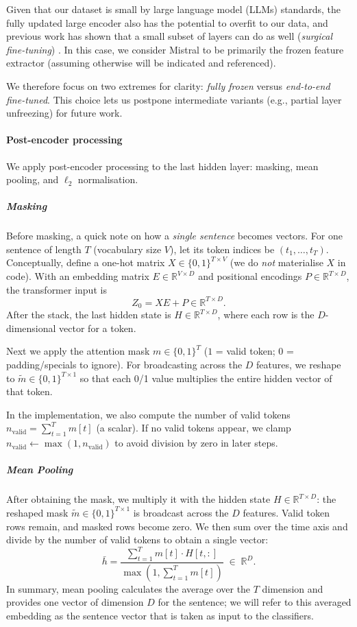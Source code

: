 \documentclass[12pt]{article}
\begin{document}
Given that our dataset is small by large language model (LLMs) standards, the fully updated large encoder also has the potential to overfit to our data, and previous work has shown that a small subset of layers can do as well (\emph{surgical fine-tuning}) \cite{lodha2023surgical}. In this case, we consider Mistral to be primarily the frozen feature extractor (assuming otherwise will be indicated and referenced).

We therefore focus on two extremes for clarity: \emph{fully frozen} versus \emph{end-to-end fine-tuned}. This choice lets us postpone intermediate variants (e.g., partial layer unfreezing) for future work.

\paragraph{Post-encoder processing}

We apply post-encoder processing to the last hidden layer: masking, mean pooling, and \(\ell_{2}\) normalisation.

%
\subparagraph{Masking}
Before masking, a quick note on how a \emph{single sentence} becomes vectors. For one sentence of length $T$ (vocabulary size $V$), let its token indices be $(t_1,\ldots,t_T)$. Conceptually, define a one-hot matrix $X \in \{0,1\}^{T \times V}$ (we do \emph{not} materialise $X$ in code). With an embedding matrix $E \in \mathbb{R}^{V \times D}$ and positional encodings $P \in \mathbb{R}^{T \times D}$, the transformer input is
\[
Z_0 = X E + P \in \mathbb{R}^{T \times D}.
\]
After the stack, the last hidden state is $H \in \mathbb{R}^{T \times D}$, where each row is the $D$-dimensional vector for a token.

Next we apply the attention mask $m \in \{0,1\}^{T}$ ($1$ = valid token; $0$ = padding/specials to ignore). For broadcasting across the $D$ features, we reshape to $\tilde{m} \in \{0,1\}^{T \times 1}$ so that each 0/1 value multiplies the entire hidden vector of that token.

In the implementation, we also compute the number of valid tokens $n_{\mathrm{valid}} = \sum_{t=1}^{T} m[t]$ (a scalar). If no valid tokens appear, we clamp $n_{\mathrm{valid}} \leftarrow \max(1, n_{\mathrm{valid}})$ to avoid division by zero in later steps.

%
\subparagraph{Mean Pooling}
After obtaining the mask, we multiply it with the hidden state $H \in \mathbb{R}^{T \times D}$:
the reshaped mask $\tilde{m} \in \{0,1\}^{T \times 1}$ is broadcast across the $D$ features. Valid token rows remain, and masked rows become zero. We then sum over the time axis and divide by the number of valid tokens to obtain a single vector:
\begin{equation}
\bar{h}
= \frac{\displaystyle \sum_{t=1}^{T} m[t] \cdot H[t,:]}
{\displaystyle \max\!\left(1, \sum_{t=1}^{T} m[t]\right)}
\;\in\; \mathbb{R}^{D}.
\end{equation}
In summary, mean pooling calculates the average over the $T$ dimension and provides one vector of dimension $D$ for the sentence; we will refer to this averaged embedding as the sentence vector that is taken as input to the classifiers.
\end{document}
